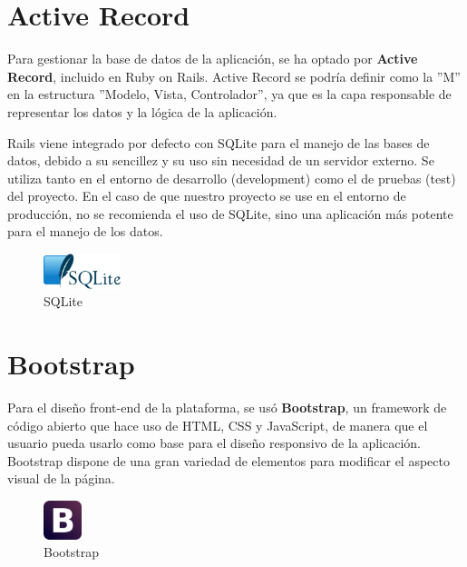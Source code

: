 \section{Active Record}
\label{3:sec:2}

Para gestionar la base de datos de la aplicación, se ha optado por \textbf{Active Record}\cite{Active}, incluido en Ruby on Rails. Active Record se podría definir como la ''M'' en la estructura ''Modelo, Vista, Controlador'', ya que es la capa responsable de representar los datos y la lógica de la aplicación.

Rails viene integrado por defecto con SQLite para el manejo de las bases de datos, debido a su sencillez y su uso sin necesidad de un servidor externo. Se utiliza tanto en el entorno de desarrollo (development) como el de pruebas (test) del proyecto. 
En el caso de que nuestro proyecto se use en el entorno de producción, no se recomienda el uso de SQLite, sino una aplicación más potente para el manejo de los datos.

\begin{figure}[!th]
\begin{center}
\includegraphics[width=0.2\textwidth]{images/logo_sqlite.eps}
\caption{SQLite}
\label{fig:5}
\end{center}
\end{figure}


\section{Bootstrap}
\label{3:sec:3}

Para el diseño front-end de la plataforma, se usó \textbf{Bootstrap}\cite{Bootstrap}, un framework de código abierto que hace uso de HTML, CSS y JavaScript, de manera que el usuario pueda usarlo como base para el diseño responsivo de la aplicación. Bootstrap dispone de una gran variedad de elementos para modificar el aspecto visual
de la página.

\begin{figure}[!th]
\begin{center}
\includegraphics[width=0.1\textwidth]{images/logo_bootstrap.eps}
\caption{Bootstrap}
\label{fig:6}
\end{center}
\end{figure}

